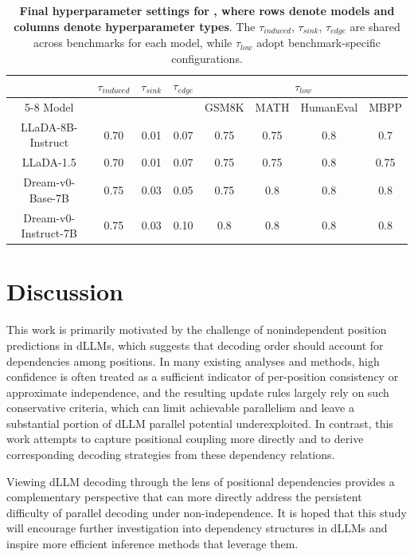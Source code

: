 \begin{table}[htbp]
  \centering
  \caption{\textbf{Final hyperparameter settings for \dawn{}, where rows denote models and columns denote hyperparameter types}. The $\tau_{induced}$, $\tau_{sink}$, $\tau_{edge}$ are shared across benchmarks for each model, while $\tau_{low}$ adopt benchmark-specific configurations.}
  \begin{tabular}{*{8}{c}}
    \toprule
    & \multirow{2}{*}{\textbf{$\tau_{induced}$}} & \multirow{2}{*}{\textbf{$\tau_{sink}$}} & \multirow{2}{*}{\textbf{$\tau_{edge}$}} & \multicolumn{4}{c}{$\tau_{low}$} \\
    \cmidrule{5-8}
    Model & & & & GSM8K & MATH & HumanEval & MBPP \\
    \midrule
    LLaDA-8B-Instruct     & 0.70 & 0.01 & 0.07 & 0.75 & 0.75 & 0.8 & 0.7\\
    LLaDA-1.5             & 0.70 & 0.01 & 0.07 & 0.75 & 0.75 & 0.8 & 0.75\\
    Dream-v0-Base-7B       & 0.75 & 0.03 & 0.05 & 0.75 & 0.8 & 0.8 & 0.8\\
    Dream-v0-Instruct-7B   & 0.75 & 0.03 & 0.10 & 0.8 & 0.8 & 0.8 & 0.8\\
    \bottomrule
  \end{tabular}
  \label{tab:4x4}
\end{table}

\section{Discussion}
This work is primarily motivated by the challenge of nonindependent position predictions in dLLMs, which suggests that decoding order should account for dependencies among positions. In many existing analyses and methods, high confidence is often treated as a sufficient indicator of per-position consistency or approximate independence, and the resulting update rules largely rely on such conservative criteria, which can limit achievable parallelism and leave a substantial portion of dLLM parallel potential underexploited. In contrast, this work attempts to capture positional coupling more directly and to derive corresponding decoding strategies from these dependency relations.

Viewing dLLM decoding through the lens of positional dependencies provides a complementary perspective that can more directly address the persistent difficulty of parallel decoding under non-independence. It is hoped that this study will encourage further investigation into dependency structures in dLLMs and inspire more efficient inference methods that leverage them.
